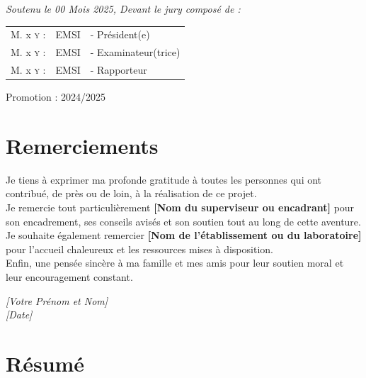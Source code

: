 \documentclass[a4paper,12pt]{report} %
\begin{document}
\begin{titlepage}
{\large \textit{Soutenu le 00 Mois 2025, Devant le jury composé de : }}\\[0.5cm]

\centering
\begin{tabular}{lll}
\large M. x \textsc{y} : & \large EMSI & \large - Président(e) \\[0.1cm]
\large M. x \textsc{y} : & \large EMSI & \large - Examinateur(trice) \\[0.1cm]
\large M. x \textsc{y} : & \large EMSI & \large - Rapporteur
\end{tabular}

\vspace{20mm}
{\large Promotion : 2024/2025}
\end{titlepage}

\chapter*{Remerciements}
\thispagestyle{empty}

\vspace{1cm}

Je tiens à exprimer ma profonde gratitude à toutes les personnes qui ont contribué, de près ou de loin, à la réalisation de ce projet.\\[0.5cm]

Je remercie tout particulièrement \textbf{[Nom du superviseur ou encadrant]} pour son encadrement, ses conseils avisés et son soutien tout au long de cette aventure.\\[0.5cm]

Je souhaite également remercier \textbf{[Nom de l'établissement ou du laboratoire]} pour l'accueil chaleureux et les ressources mises à disposition.\\[0.5cm]

Enfin, une pensée sincère à ma famille et mes amis pour leur soutien moral et leur encouragement constant.

\vfill

\begin{flushright}
    \textit{[Votre Prénom et Nom]}\\
    \textit{[Date]}
\end{flushright}

\chapter*{Résumé}
\thispagestyle{empty}

\vspace{0.5cm}
\end{document}
